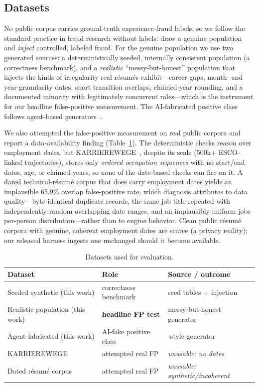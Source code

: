 \documentclass[11pt]{article}
\begin{document}
\subsection{Datasets}\label{sec:datasets}
No public corpus carries ground-truth experience-fraud labels, so we follow the
standard practice in fraud research without labels: draw a genuine population and
\emph{inject} controlled, labeled fraud. For the genuine population we use two
generated sources: a deterministically seeded, internally consistent population
(a correctness benchmark), and a \emph{realistic} ``messy-but-honest'' population
that injects the kinds of irregularity real r\'esum\'es exhibit---career gaps,
month- and year-granularity dates, short transition overlaps, claimed-year
rounding, and a documented minority with legitimately concurrent roles---which is
the instrument for our headline false-positive measurement. The AI-fabricated
positive class follows agent-based generators~\cite{agentgen2025}.

We also attempted the false-positive measurement on real public corpora and
report a data-availability finding (Table~\ref{tab:datasets}). The deterministic
checks reason over employment \emph{dates}, but
KARRIEREWEGE~\cite{karrierewege2025}, despite its scale (500k+ ESCO-linked
trajectories), stores only \emph{ordered occupation sequences} with no start/end
dates, age, or claimed-years, so none of the date-based checks can fire on it. A
dated technical-r\'esum\'e corpus that does carry employment dates yields an
implausible 65.9\% overlap false-positive rate, which diagnosis attributes to data
quality---byte-identical duplicate records, the same job title repeated with
independently-random overlapping date ranges, and an implausibly uniform
jobs-per-person distribution---rather than to engine behavior. Clean public
r\'esum\'e corpora with genuine, coherent employment dates are scarce (a privacy
reality); our released harness ingests one unchanged should it become available.

\begin{table}[t]\centering\small
\caption{Datasets used for evaluation.}\label{tab:datasets}
\begin{tabular}{lll}
\toprule
Dataset & Role & Source / outcome \\
\midrule
Seeded synthetic (this work) & correctness benchmark & seed tables + injection \\
Realistic population (this work) & \textbf{headline FP test} & messy-but-honest generator \\
Agent-fabricated (this work) & AI-fake positive class & \cite{agentgen2025}-style generator \\
KARRIEREWEGE~\cite{karrierewege2025} & attempted real FP & \emph{unusable: no dates} \\
Dated r\'esum\'e corpus & attempted real FP & \emph{unusable: synthetic/incoherent} \\
\bottomrule
\end{tabular}
\end{table}
\end{document}
